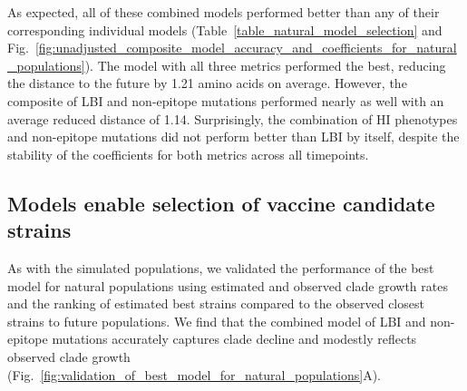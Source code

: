 As expected, all of these combined models performed better than any of their corresponding individual models (Table~\ref{table_natural_model_selection} and Fig.~\ref{fig:unadjusted_composite_model_accuracy_and_coefficients_for_natural_populations}).
The model with all three metrics performed the best, reducing the distance to the future by 1.21 amino acids on average.
However, the composite of LBI and non-epitope mutations performed nearly as well with an average reduced distance of 1.14.
Surprisingly, the combination of HI phenotypes and non-epitope mutations did not perform better than LBI by itself, despite the stability of the coefficients for both metrics across all timepoints.

\subsection*{Models enable selection of vaccine candidate strains}

As with the simulated populations, we validated the performance of the best model for natural populations using estimated and observed clade growth rates and the ranking of estimated best strains compared to the observed closest strains to future populations.
We find that the combined model of LBI and non-epitope mutations accurately captures clade decline and modestly reflects observed clade growth (Fig.~\ref{fig:validation_of_best_model_for_natural_populations}A).

